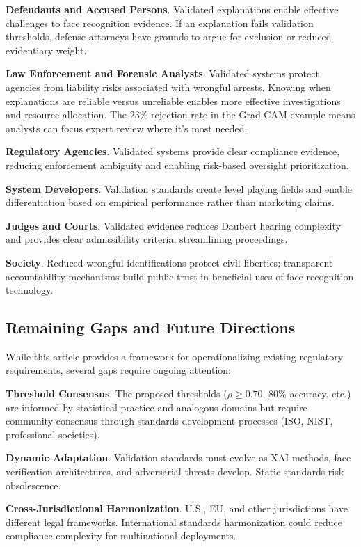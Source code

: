\textbf{Defendants and Accused Persons}. Validated explanations enable effective challenges to face recognition evidence. If an explanation fails validation thresholds, defense attorneys have grounds to argue for exclusion or reduced evidentiary weight.

\textbf{Law Enforcement and Forensic Analysts}. Validated systems protect agencies from liability risks associated with wrongful arrests. Knowing when explanations are reliable versus unreliable enables more effective investigations and resource allocation. The 23\% rejection rate in the Grad-CAM example means analysts can focus expert review where it's most needed.

\textbf{Regulatory Agencies}. Validated systems provide clear compliance evidence, reducing enforcement ambiguity and enabling risk-based oversight prioritization.

\textbf{System Developers}. Validation standards create level playing fields and enable differentiation based on empirical performance rather than marketing claims.

\textbf{Judges and Courts}. Validated evidence reduces Daubert hearing complexity and provides clear admissibility criteria, streamlining proceedings.

\textbf{Society}. Reduced wrongful identifications protect civil liberties; transparent accountability mechanisms build public trust in beneficial uses of face recognition technology.

\subsection{Remaining Gaps and Future Directions}

While this article provides a framework for operationalizing existing regulatory requirements, several gaps require ongoing attention:

\textbf{Threshold Consensus}. The proposed thresholds ($\rho \geq 0.70$, 80\% accuracy, etc.) are informed by statistical practice and analogous domains but require community consensus through standards development processes (ISO, NIST, professional societies).

\textbf{Dynamic Adaptation}. Validation standards must evolve as XAI methods, face verification architectures, and adversarial threats develop. Static standards risk obsolescence.

\textbf{Cross-Jurisdictional Harmonization}. U.S., EU, and other jurisdictions have different legal frameworks. International standards harmonization could reduce compliance complexity for multinational deployments.

